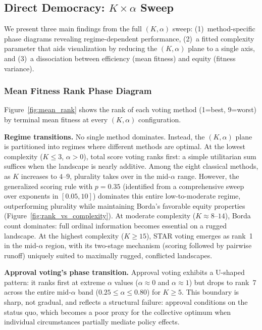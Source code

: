 
\subsection{Direct Democracy: $K \times \alpha$ Sweep}

We present three main findings from the full $(K, \alpha)$ sweep: (1)~method-specific phase diagrams revealing regime-dependent performance, (2)~a fitted complexity parameter that aids visualization by reducing the $(K, \alpha)$ plane to a single axis, and (3)~a dissociation between efficiency (mean fitness) and equity (fitness variance).

\subsubsection{Mean Fitness Rank Phase Diagram}

Figure~\ref{fig:mean_rank} shows the rank of each voting method (1=best, 9=worst) by terminal mean fitness at every $(K, \alpha)$ configuration.

\textbf{Regime transitions.} No single method dominates. Instead, the $(K, \alpha)$ plane is partitioned into regimes where different methods are optimal. At the lowest complexity ($K \leq 3$, $\alpha > 0$), total score voting ranks first: a simple utilitarian sum suffices when the landscape is nearly additive. Among the eight classical methods, as $K$ increases to $4$--$9$, plurality takes over in the mid-$\alpha$ range. However, the generalized scoring rule with $p=0.35$ (identified from a comprehensive sweep over exponents in $[0.05, 10]$) dominates this entire low-to-moderate regime, outperforming plurality while maintaining Borda's favorable equity properties (Figure~\ref{fig:rank_vs_complexity}). At moderate complexity ($K \approx 8$--$14$), Borda count dominates: full ordinal information becomes essential on a rugged landscape. At the highest complexity ($K \geq 15$), STAR voting emerges as rank~1 in the mid-$\alpha$ region, with its two-stage mechanism (scoring followed by pairwise runoff) uniquely suited to maximally rugged, conflicted landscapes.

\textbf{Approval voting's phase transition.} Approval voting exhibits a U-shaped pattern: it ranks first at extreme $\alpha$ values ($\alpha \approx 0$ and $\alpha \approx 1$) but drops to rank~7 across the entire mid-$\alpha$ band ($0.25 \leq \alpha \leq 0.80$) for $K \geq 5$. This boundary is sharp, not gradual, and reflects a structural failure: approval conditions on the status quo, which becomes a poor proxy for the collective optimum when individual circumstances partially mediate policy effects.

